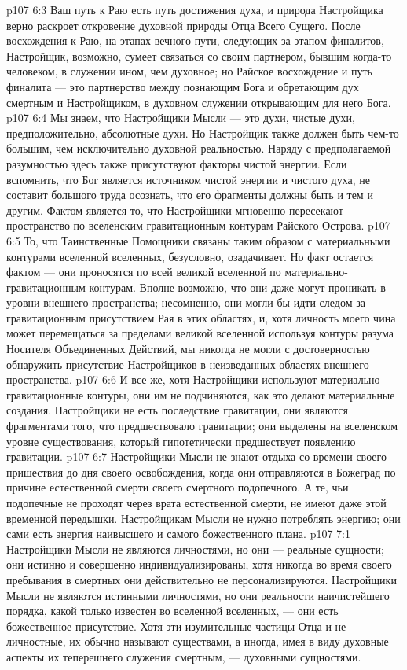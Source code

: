 \vs p107 6:3 Ваш путь к Раю есть путь достижения духа, и природа Настройщика верно раскроет откровение духовной природы Отца Всего Сущего. После восхождения к Раю, на этапах вечного пути, следующих за этапом финалитов, Настройщик, возможно, сумеет связаться со своим партнером, бывшим когда\hyp{}то человеком, в служении ином, чем духовное; но Райское восхождение и путь финалита --- это партнерство между познающим Бога и обретающим дух смертным и Настройщиком, в духовном служении открывающим для него Бога.
\vs p107 6:4 \pc Мы знаем, что Настройщики Мысли --- это духи, чистые духи, предположительно, абсолютные духи. Но Настройщик также должен быть чем\hyp{}то большим, чем исключительно духовной реальностью. Наряду с предполагаемой разумностью здесь также присутствуют факторы чистой энергии. Если вспомнить, что Бог является источником чистой энергии и чистого духа, не составит большого труда осознать, что его фрагменты должны быть и тем и другим. Фактом является то, что Настройщики мгновенно пересекают пространство по вселенским гравитационным контурам Райского Острова.
\vs p107 6:5 То, что Таинственные Помощники связаны таким образом с материальными контурами вселенной вселенных, безусловно, озадачивает. Но факт остается фактом --- они проносятся по всей великой вселенной по материально\hyp{}гравитационным контурам. Вполне возможно, что они даже могут проникать в уровни внешнего пространства; несомненно, они могли бы идти следом за гравитационным присутствием Рая в этих областях, и, хотя личность моего чина может перемещаться за пределами великой вселенной используя контуры разума Носителя Объединенных Действий, мы никогда не могли с достоверностью обнаружить присутствие Настройщиков в неизведанных областях внешнего пространства.
\vs p107 6:6 И все же, хотя Настройщики используют материально\hyp{}гравитационные контуры, они им не подчиняются, как это делают материальные создания. Настройщики не есть последствие гравитации, они являются фрагментами того, что предшествовало гравитации; они выделены на вселенском уровне существования, который гипотетически предшествует появлению гравитации.
\vs p107 6:7 Настройщики Мысли не знают отдыха со времени своего пришествия до дня своего освобождения, когда они отправляются в Божеград по причине естественной смерти своего смертного подопечного. А те, чьи подопечные не проходят через врата естественной смерти, не имеют даже этой временной передышки. Настройщикам Мысли не нужно потреблять энергию; они сами есть энергия наивысшего и самого божественного плана.
\vs p107 7:1 Настройщики Мысли не являются личностями, но они --- реальные сущности; они истинно и совершенно индивидуализированы, хотя никогда во время своего пребывания в смертных они действительно не персонализируются. Настройщики Мысли не являются истинными личностями, но они  реальности наичистейшего порядка, какой только известен во вселенной вселенных, --- они есть божественное присутствие. Хотя эти изумительные частицы Отца и не личностные, их обычно называют существами, а иногда, имея в виду духовные аспекты их теперешнего служения смертным, --- духовными сущностями.
